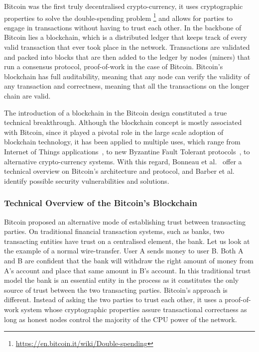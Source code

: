 Bitcoin was the first truly decentralised crypto-currency, it uses cryptographic properties to solve the double-spending problem \footnote{\url{https://en.bitcoin.it/wiki/Double-spending}} and allows for parties to engage in transactions without having to trust each other. In the backbone of Bitcoin lies a blockchain, which is a distributed ledger that keeps track of every valid transaction that ever took place in the network. Transactions are validated and packed into blocks that are then added to the ledger by nodes (miners) that run a consensus protocol, proof-of-work in the case of Bitcoin. Bitcoin's blockchain has full auditability, meaning that any node can verify the validity of any transaction and correctness, meaning that all the transactions on the longer chain are valid.

The introduction of a blockchain in the Bitcoin design constituted a true technical breakthrough. Although the blockchain concept is mostly associated with Bitcoin, since it played a pivotal role in the large scale adoption of blockchain technology, it has been applied to multiple uses, which range from Internet of Things applications~\cite{Christidis:2016bn}, to new Byzantine Fault Tolerant protocols~\cite{Miller:2016wo}, to alternative crypto-currency systems. With this regard, Bonneau et al.~\cite{Bonneau:2015ema} offer a technical overview on Bitcoin's architecture and protocol, and Barber et al.~\cite{Barber:2012va} identify possible security vulnerabilities and solutions.




\subsubsection{Technical Overview of the Bitcoin's Blockchain}
\label{sec:tech_bitcoin}

Bitcoin proposed an alternative mode of establishing trust between transacting parties. On traditional financial transaction systems, such as banks, two transacting entities have trust on a centralised element, the bank. Let us look at the example of a normal wire-transfer. User A sends money to user B. Both A and B are confident that the bank will withdraw the right amount of money from A's account and place that same amount in B's account. In this traditional trust model the bank is an essential entity in the process as it constitutes the only source of trust between the two transacting parties. Bitcoin's approach is different. Instead of asking the two parties to trust each other, it uses a proof-of-work system whose cryptographic properties assure transactional correctness as long as honest nodes control the majority of the CPU power of the network.

